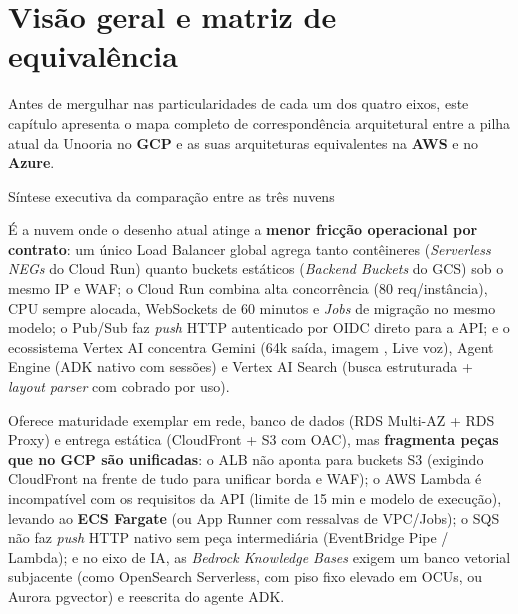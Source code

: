 \chapter{Visão geral e matriz de equivalência}
\label{cap:visao-geral}

Antes de mergulhar nas particularidades de cada um dos quatro eixos, este
capítulo apresenta o mapa completo de correspondência arquitetural entre a pilha
atual da Unooria no \textbf{GCP} e as suas arquiteturas equivalentes na
\textbf{AWS} e no \textbf{Azure}.

\begin{fichaeixo}{Síntese executiva da comparação entre as três nuvens}
\begin{campos}
  \item[GCP (Atual)] \nativo\enspace É a nuvem onde o desenho atual atinge a
    \textbf{menor fricção operacional por contrato}: um único Load Balancer
    global agrega tanto contêineres (\emph{Serverless NEGs} do Cloud Run) quanto
    buckets estáticos (\emph{Backend Buckets} do GCS) sob o mesmo IP e WAF; o
    Cloud Run combina alta concorrência (80 req/instância), CPU sempre alocada,
    WebSockets de 60 minutos e \emph{Jobs} de migração no mesmo modelo; o
    Pub/Sub faz \emph{push} HTTP autenticado por OIDC direto para a API; e o
    ecossistema Vertex AI concentra Gemini (64k saída, imagem , Live
    voz), Agent Engine (ADK nativo com sessões) e Vertex AI Search (busca
    estruturada + \emph{layout parser} com  cobrado por uso).
  \item[AWS] \adaptacao\enspace Oferece maturidade exemplar em rede, banco de
    dados (RDS Multi-AZ + RDS Proxy) e entrega estática (CloudFront + S3 com
    OAC), mas \textbf{fragmenta peças que no GCP são unificadas}: o ALB não
    aponta para buckets S3 (exigindo CloudFront na frente de tudo para unificar
    borda e WAF); o AWS Lambda é incompatível com os requisitos da API (limite
    de 15 min e modelo de execução), levando ao \textbf{ECS Fargate} (ou App
    Runner com ressalvas de VPC/Jobs); o SQS não faz \emph{push} HTTP nativo
    sem peça intermediária (EventBridge Pipe / Lambda); e no eixo de IA, as
    \emph{Bedrock Knowledge Bases} exigem um banco vetorial subjacente (como
    OpenSearch Serverless, com piso fixo elevado em OCUs, ou Aurora pgvector) e
    reescrita do agente ADK.

\end{campos}
\end{fichaeixo}
